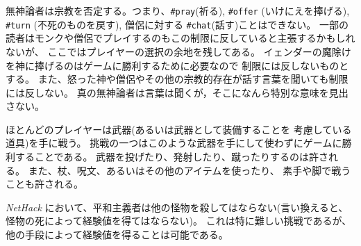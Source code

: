 無神論者は宗教を否定する。つまり、{\tt \#pray}(祈る), {\tt \#offer}
(いけにえを捧げる),
{\tt \#turn} (不死のものを戻す), 僧侶に対する {\tt \#chat}(話す)ことはできない。
一部の読者はモンクや僧侶でプレイするのもこの制限に反していると主張するかもしれないが、
ここではプレイヤーの選択の余地を残してある。
イェンダーの魔除けを神に捧げるのはゲームに勝利するために必要なので
制限には反しないものとする。
また、怒った神や僧侶やその他の宗教的存在が話す言葉を聞いても制限には反しない。
真の無神論者は言葉は聞くが，そこになんら特別な意味を見出さない。

ほとんどのプレイヤーは武器(あるいは武器として装備することを
考慮している道具)を手に戦う。
挑戦の一つはこのような武器を手にして使わずにゲームに勝利することである。
武器を投げたり、発射したり、蹴ったりするのは許される。
また、杖、呪文、あるいはその他のアイテムを使ったり、
素手や脚で戦うことも許される。

{\it NetHack\/} において、平和主義者は他の怪物を殺してはならない(言い換えると、
怪物の死によって経験値を得てはならない)。
これは特に難しい挑戦であるが、他の手段によって経験値を得ることは可能である。

